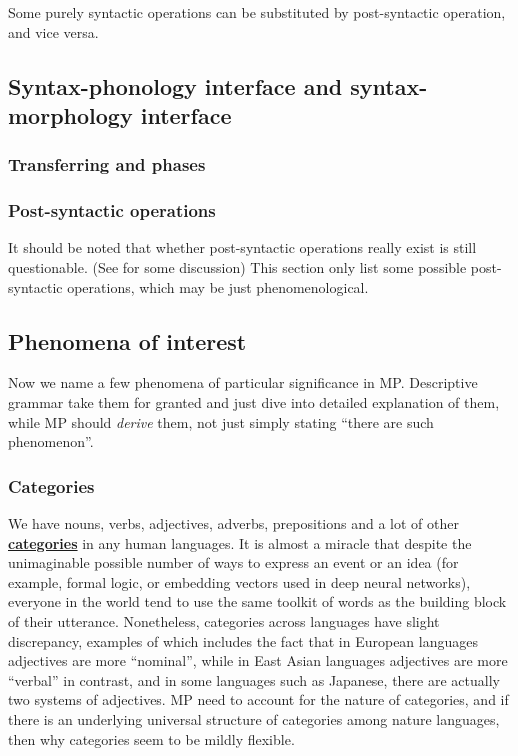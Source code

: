 \documentclass[a4paper]{article}
\newcommand*{\concept}[1]{\underline{\textbf{#1}}}
\begin{document}
Some purely syntactic operations can be substituted by post-syntactic operation, and vice versa.

\subsection{Syntax-phonology interface and syntax-morphology interface}

\subsubsection{Transferring and phases}

\subsubsection{Post-syntactic operations}

It should be noted that whether post-syntactic operations really exist is still questionable. (See  for some discussion)
This section only list some possible post-syntactic operations, which may be just phenomenological.

\subsection{Phenomena of interest}

Now we name a few phenomena of particular significance in MP.
Descriptive grammar take them for granted and just dive into detailed explanation of them, while MP should \emph{derive} them, not just simply stating ``there are such phenomenon''.

\subsubsection{Categories}

We have nouns, verbs, adjectives, adverbs, prepositions and a lot of other \concept{categories} in any human languages.
It is almost a miracle that despite the unimaginable possible number of ways to express an event or an idea (for example, formal logic, or embedding vectors used in deep neural networks), everyone in the world tend to use the same toolkit of words as the building block of their utterance.
Nonetheless, categories across languages have slight discrepancy, examples of which includes the fact that in European languages adjectives are more ``nominal'', while in East Asian languages adjectives are more ``verbal'' in contrast, and in some languages such as Japanese, there are actually two systems of adjectives.
MP need to account for the nature of categories, and if there is an underlying universal structure of categories among nature languages, then why categories seem to be mildly flexible.
\end{document}
